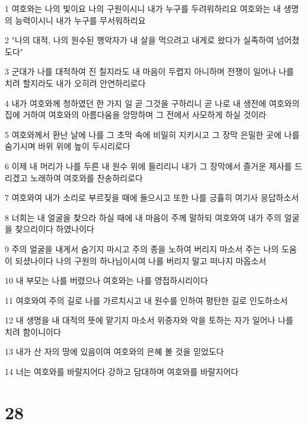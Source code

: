 \par 1 여호와는 나의 빛이요 나의 구원이시니 내가 누구를 두려워하리요 여호와는 내 생명의 능력이시니 내가 누구를 무서워하리요
\par 2 "나의 대적, 나의 원수된 행악자가 내 살을 먹으려고 내게로 왔다가 실족하여 넘어졌도다"
\par 3 군대가 나를 대적하여 진 칠지라도 내 마음이 두렵지 아니하며 전쟁이 일어나 나를 치려 할지라도 내가 오히려 안연하리로다
\par 4 내가 여호와께 청하였던 한 가지 일 곧 그것을 구하리니 곧 나로 내 생전에 여호와의 집에 거하여 여호와의 아름다움을 앙망하며 그 전에서 사모하게 하실 것이라
\par 5 여호와께서 환난 날에 나를 그 초막 속에 비밀히 지키시고 그 장막 은밀한 곳에 나를 숨기시며 바위 위에 높이 두시리로다
\par 6 이제 내 머리가 나를 두른 내 원수 위에 들리리니 내가 그 장막에서 즐거운 제사를 드리겠고 노래하여 여호와를 찬송하리로다
\par 7 여호와여 내가 소리로 부르짖을 때에 들으시고 또한 나를 긍휼히 여기사 응답하소서
\par 8 너희는 내 얼굴을 찾으라 하실 때에 내 마음이 주께 말하되 여호와여 내가 주의 얼굴을 찾으리이다 하였나이다
\par 9 주의 얼굴을 내게서 숨기지 마시고 주의 종을 노하여 버리지 마소서 주는 나의 도움이 되셨나이다 나의 구원의 하나님이시여 나를 버리지 말고 떠나지 마옵소서
\par 10 내 부모는 나를 버렸으나 여호와는 나를 영접하시리이다
\par 11 여호와여 주의 길로 나를 가르치시고 내 원수를 인하여 평탄한 길로 인도하소서
\par 12 내 생명을 내 대적의 뜻에 맡기지 마소서 위증자와 악을 토하는 자가 일어나 나를 치려 함이니이다
\par 13 내가 산 자의 땅에 있음이여 여호와의 은혜 볼 것을 믿었도다
\par 14 너는 여호와를 바랄지어다 강하고 담대하며 여호와를 바랄지어다

\chapter{28}

